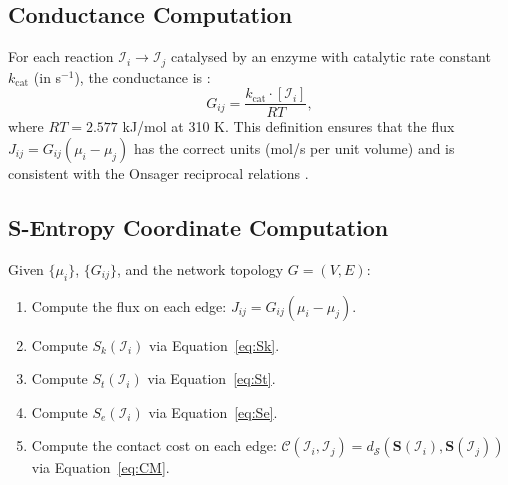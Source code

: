 \documentclass[11pt,twocolumn]{article}
\theoremstyle{plain}
\theoremstyle{definition}
\newcommand{\CC}{\mathcal{C}}
\newcommand{\Sk}{S_k}
\newcommand{\St}{S_t}
\newcommand{\Se}{S_e}
\newcommand{\bS}{\mathbf{S}}
\newcommand{\dS}{d_{\mathcal{S}}}
\begin{document}
\subsection{Conductance Computation}

For each reaction $\mathcal{I}_i \to \mathcal{I}_j$ catalysed by an enzyme with
catalytic rate constant $k_{\text{cat}}$ (in s$^{-1}$), the conductance is
\cite{beard2002energy, noor2014pathway}:
\begin{equation}\label{eq:G}
  G_{ij} = \frac{k_{\text{cat}} \cdot [\mathcal{I}_i]}{RT},
\end{equation}
where $RT = 2.577$ kJ/mol at 310 K. This definition ensures that the flux
$J_{ij} = G_{ij}(\mu_i - \mu_j)$ has the correct units (mol/s per unit
volume) and is consistent with the Onsager reciprocal relations
\cite{onsager1931reciprocal}.

\subsection{S-Entropy Coordinate Computation}

Given $\{\mu_i\}$, $\{G_{ij}\}$, and the network topology $G = (V, E)$:

\begin{enumerate}[label=\arabic*.]
\item Compute the flux on each edge: $J_{ij} = G_{ij}(\mu_i - \mu_j)$.
\item Compute $\Sk(\mathcal{I}_i)$ via Equation~\eqref{eq:Sk}.
\item Compute $\St(\mathcal{I}_i)$ via Equation~\eqref{eq:St}.
\item Compute $\Se(\mathcal{I}_i)$ via Equation~\eqref{eq:Se}.
\item Compute the contact cost on each edge: $\CC(\mathcal{I}_i, \mathcal{I}_j)
  = \dS(\bS(\mathcal{I}_i), \bS(\mathcal{I}_j))$ via Equation~\eqref{eq:CM}.
\end{enumerate}
\end{document}
